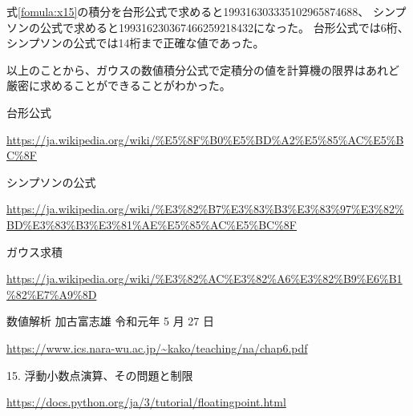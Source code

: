 \documentclass[dvipdfmx]{jsarticle}
\begin{document}
式\ref{fomula:x15}の積分を台形公式で求めると199316303335102965874688、
シンプソンの公式で求めると199316230367466259218432になった。
台形公式では6桁、シンプソンの公式では14桁まで正確な値であった。

以上のことから、ガウスの数値積分公式で定積分の値を計算機の限界はあれど
厳密に求めることができることがわかった。

\begin{thebibliography}{10}
   台形公式

  \url{https://ja.wikipedia.org/wiki/%E5%8F%B0%E5%BD%A2%E5%85%AC%E5%BC%8F}

   シンプソンの公式

  \url{https://ja.wikipedia.org/wiki/%E3%82%B7%E3%83%B3%E3%83%97%E3%82%BD%E3%83%B3%E3%81%AE%E5%85%AC%E5%BC%8F}

   ガウス求積

  \url{https://ja.wikipedia.org/wiki/%E3%82%AC%E3%82%A6%E3%82%B9%E6%B1%82%E7%A9%8D}

   数値解析 加古富志雄 令和元年 5 月 27 日

  \url{https://www.ics.nara-wu.ac.jp/~kako/teaching/na/chap6.pdf}

   15. 浮動小数点演算、その問題と制限

  \url{https://docs.python.org/ja/3/tutorial/floatingpoint.html}

\end{thebibliography}
\end{document}
